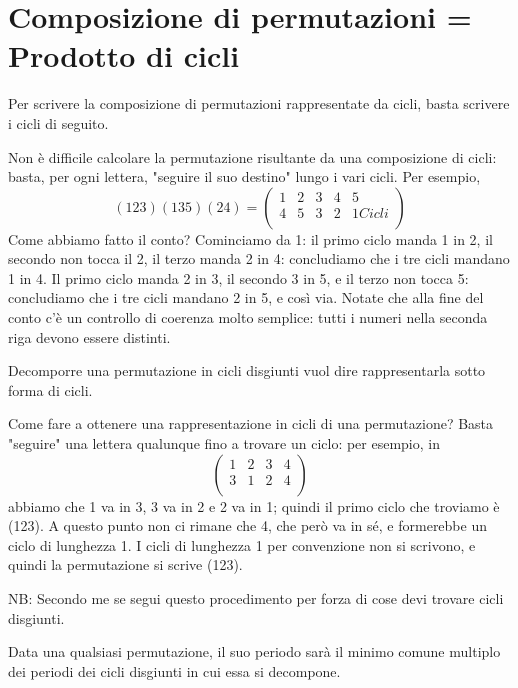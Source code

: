 \section{Composizione di permutazioni = Prodotto di cicli}
Per scrivere la composizione di permutazioni rappresentate da cicli,
basta scrivere i cicli di seguito.

Non è difficile calcolare la permutazione risultante da una composizione di cicli: basta, per ogni lettera, "seguire il suo destino" lungo
i vari cicli. Per esempio,
\[
 (123)(135)(24) = \left(\begin{array}{ccccc}
                         1 & 2 & 3 & 4 & 5 \\
                         4 & 5 & 3 & 2 & 1 Cicli\\
                        \end{array} \right)
\]
Come abbiamo fatto il conto? Cominciamo da 1: il primo ciclo manda 1 in 2, il secondo non tocca il 2, il terzo manda 2 in 4: concludiamo
che i tre cicli mandano 1 in 4. Il primo ciclo manda 2 in 3, il secondo 3 in 5, e il terzo non tocca 5: concludiamo che i tre cicli
mandano 2 in 5, e così via. Notate che alla fine del conto c'è un controllo di coerenza molto semplice:  tutti i numeri
nella seconda riga devono essere distinti.

\begin{definizione}
Decomporre una permutazione in cicli disgiunti vuol dire rappresentarla sotto forma di cicli.
\end{definizione}

Come fare a ottenere una rappresentazione in cicli di una permutazione? Basta "seguire" una lettera qualunque fino a trovare
un ciclo: per esempio, in 
\[
\left( \begin{array}{cccc} 1 & 2 & 3 & 4 \\ 3 & 1 & 2 & 4 \\ \end{array} \right) 
\]
abbiamo che 1 va in 3, 3 va in 2 e 2 va in 1; quindi il primo ciclo che troviamo è (123). A questo punto non ci rimane che 4,
che però va in sé, e formerebbe un ciclo di lunghezza 1. I cicli di lunghezza 1 per convenzione non si scrivono, e
quindi la permutazione si scrive (123).

NB: Secondo me se segui questo procedimento per forza di cose devi trovare cicli disgiunti.

\begin{definizione}
Data una qualsiasi permutazione, il suo periodo sarà il minimo comune multiplo dei periodi dei cicli disgiunti in cui essa si decompone. 
\end{definizione}

